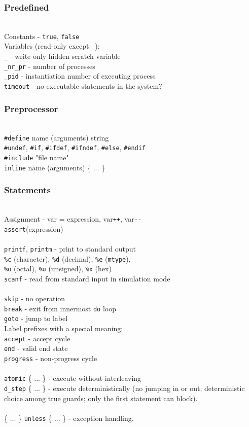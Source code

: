 \documentclass{leaflet}
\newcommand{\sct}[1]{\subsubsection{#1}\mbox{}\\}
\newcommand{\spc}{\hspace*{1.5em}}
\begin{document}
\sct{Predefined}
Constants - \texttt{true}, \texttt{false}\\
Variables (read-only except \texttt{\_}):\\
\spc{}\texttt{\_} - write-only hidden scratch variable\\
\spc{}\texttt{\_nr\_pr} - number of processes\\
\spc{}\texttt{\_pid} - instantiation number of executing process\\
\spc{}\texttt{timeout} - no executable statements in the system?

\sct{Preprocessor}
\texttt{\#define} name (arguments) string\\
\texttt{\#undef}, \texttt{\#if}, \texttt{\#ifdef}, \texttt{\#ifndef}, \texttt{\#else}, \texttt{\#endif}\\
\texttt{\#include} "file name"\\
\texttt{inline} name (arguments) \{ ... \}

\sct{Statements} 
Assignment - var = expression, var\verb=++=, var\verb=--=\\
\texttt{assert}(expression)\\
\\
\texttt{printf}, \texttt{printm} - print to standard output\\
\spc{}\verb=%c= (character), \verb=%d= (decimal), \verb=%e= (\texttt{mtype}),\\
\spc{}\verb=%o= (octal), \verb=%u= (unsigned), \verb=%x= (hex)\\
\texttt{scanf} - read from standard input in simulation mode\\
\\
\texttt{skip} - no operation\\
\texttt{break} - exit from innermost \texttt{do} loop\\
\texttt{goto} - jump to label\\
Label prefixes with a special meaning:\\
\spc{}\texttt{accept} - accept cycle\\
\spc{}\texttt{end} - valid end state\\
\spc{}\texttt{progress} - non-progress cycle\\
\\
\texttt{atomic} \{ ... \} - execute without interleaving\\
\texttt{d\_step} \{ ... \} - execute deterministically (no jumping 
in or out; deterministic choice among true guards; only the first
statement can block).\\
\\
\{ ... \} \texttt{unless} \{ ... \} - exception handling.
\end{document}
